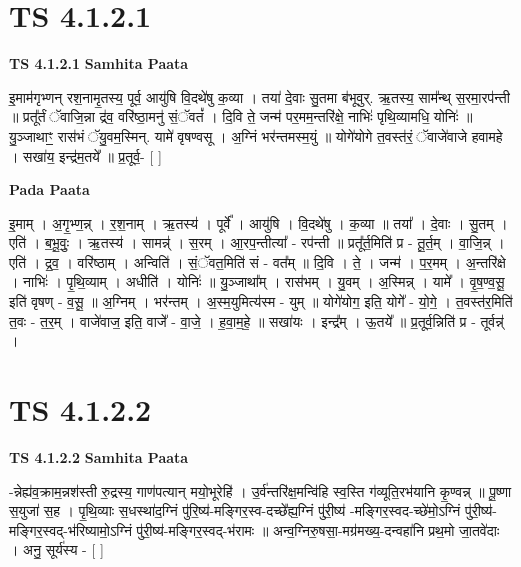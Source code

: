 \documentclass[17pt]{extarticle}
\begin{document}
\section*{ TS 4.1.2.1 }

\textbf{TS 4.1.2.1 } \newline
\textbf{Samhita Paata} \newline

इ॒माम॑गृभ्णन् रश॒नामृ॒तस्य॒ पूर्व॒ आयु॑षि वि॒दथे॑षु क॒व्या । तया॑ दे॒वाः सु॒तमा ब॑भूवुर्. ऋ॒तस्य॒ साम᳚न्थ् स॒रमा॒रप॑न्ती ॥ प्रतू᳚र्तं ॅवाजि॒न्ना द्र॑व॒ वरि॑ष्ठा॒मनु॑ सं॒ॅवतं᳚ । दि॒वि ते॒ जन्म॑ पर॒मम॒न्तरि॑क्षे॒ नाभिः॑ पृथि॒व्यामधि॒ योनिः॑ ॥ यु॒ञ्जाथाꣳ॒॒ रास॑भं ॅयु॒वम॒स्मिन्. यामे॑ वृषण्वसू । अ॒ग्निं भर॑न्तमस्म॒युं ॥ योगे॑योगे त॒वस्त॑रं॒ ॅवाजे॑वाजे हवामहे । सखा॑य॒ इन्द्र॑म॒तये᳚ ॥ प्र॒तूर्व॒- [  ] \newline

\textbf{Pada Paata} \newline

इ॒माम् । अ॒गृ॒भ्ण॒न्न् । र॒श॒नाम् । ऋ॒तस्य॑ । पूर्वे᳚ । आयु॑षि । वि॒दथे॑षु । क॒व्या ॥ तया᳚ । दे॒वाः । सु॒तम् । एति॑ । ब॒भू॒वुः॒ । ऋ॒तस्य॑ । सामन्न्॑ । स॒रम् । आ॒रप॒न्तीत्या᳚ - रप॑न्ती ॥ प्रतू᳚र्त॒मिति॑ प्र - तू॒र्त॒म् । वा॒जि॒न्न् । एति॑ । द्र॒व॒ । वरि॑ष्ठाम् । अन्विति॑ । सं॒ॅवत॒मिति॑ सं - वत᳚म् ॥ दि॒वि । ते॒ । जन्म॑ । प॒र॒मम् । अ॒न्तरि॑क्षे । नाभिः॑ । पृ॒थि॒व्याम् । अधीति॑ । योनिः॑ ॥ यु॒ञ्जाथा᳚म् । रास॑भम् । यु॒वम् । अ॒स्मिन्न् । यामे᳚ । वृ॒ष॒ण्व॒सू॒ इति॑ वृषण् - व॒सू॒ ॥ अ॒ग्निम् । भर॑न्तम् । अ॒स्म॒युमित्य॑स्म - युम् ॥ योगे॑योग॒ इति॒ योगे᳚ - यो॒गे॒ । त॒वस्त॑र॒मिति॑ त॒वः - त॒र॒म् । वाजे॑वाज॒ इति॒ वाजे᳚ - वा॒जे॒ । ह॒वा॒म॒हे॒ ॥ सखा॑यः । इन्द्र᳚म् । ऊ॒तये᳚ ॥ प्र॒तूर्व॒न्निति॑ प्र - तूर्वन्न्॑ ।  \newline




\section*{ TS 4.1.2.2 }

\textbf{TS 4.1.2.2 } \newline
\textbf{Samhita Paata} \newline

-न्नेह्य॑व॒क्राम॒न्नश॑स्ती रु॒द्रस्य॒ गाण॑पत्यान् मयो॒भूरेहि॑ । उ॒र्व॑न्तरि॑क्ष॒मन्वि॑हि स्व॒स्ति ग॑व्यूति॒रभ॑यानि कृ॒ण्वन्न् ॥ पू॒ष्णा स॒युजा॑ स॒ह । पृ॒थि॒व्याः स॒धस्था॑द॒ग्निं पु॑रि॒ष्य॑-मङ्गिर॒स्व-दच्छे᳚ह्य॒ग्निं पु॑री॒ष्य॑ -मङ्गिर॒स्वद-च्छे॑मो॒ऽग्निं पु॑री॒ष्य॑-मङ्गिर॒स्वद्-भ॑रिष्यामो॒ऽग्निं पु॑री॒ष्य॑-मङ्गिर॒स्वद्-भ॑रामः ॥ अन्व॒ग्निरु॒षसा॒-मग्र॑मख्य॒-दन्वहा॑नि प्रथ॒मो जा॒तवे॑दाः । अनु॒ सूर्य॑स्य - [  ] \newline
\end{document}
